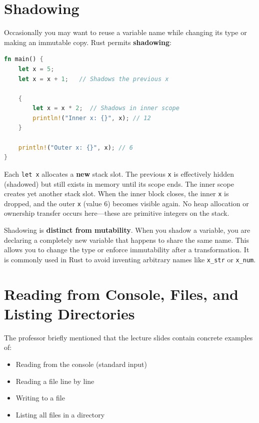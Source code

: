 \section{Shadowing}

Occasionally you may want to reuse a variable name while changing its type or making an immutable copy. Rust permits \textbf{shadowing}:

\begin{lstlisting}[language=Rust]
fn main() {
    let x = 5;
    let x = x + 1;   // Shadows the previous x

    {
        let x = x * 2;  // Shadows in inner scope
        println!("Inner x: {}", x); // 12
    }

    println!("Outer x: {}", x); // 6
}
\end{lstlisting}

\begin{memoryblock}
Each \texttt{let x} allocates a \textbf{new} stack slot. The previous \texttt{x} is effectively hidden (shadowed) but still exists in memory until its scope ends. The inner scope creates yet another stack slot. When the inner block closes, the inner \texttt{x} is dropped, and the outer \texttt{x} (value 6) becomes visible again. No heap allocation or ownership transfer occurs here---these are primitive integers on the stack.
\end{memoryblock}

\begin{insightbox}
Shadowing is \textbf{distinct from mutability}. When you shadow a variable, you are declaring a completely new variable that happens to share the same name. This allows you to change the type or enforce immutability after a transformation. It is commonly used in Rust to avoid inventing arbitrary names like \texttt{x\_str} or \texttt{x\_num}.
\end{insightbox}

\section{Reading from Console, Files, and Listing Directories}

The professor briefly mentioned that the lecture slides contain concrete examples of:
\begin{itemize}
    \item Reading from the console (standard input)
    \item Reading a file line by line
    \item Writing to a file
    \item Listing all files in a directory
\end{itemize}

